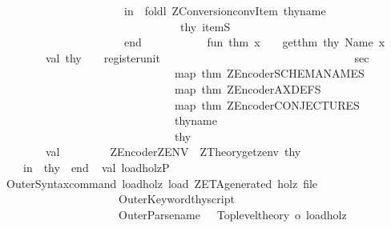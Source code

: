 \begin{isabellebody}
\ \ \ \ \ \ \ \ \ \ \ \ \ \ \ \ \ \ \ \ \ \ \ \ \ in\ \ foldl\ {\isacharparenleft}ZConversion{\isachardot}convItem\ thy{\isacharunderscore}name{\isacharparenright}\ \isanewline
\ \ \ \ \ \ \ \ \ \ \ \ \ \ \ \ \ \ \ \ \ \ \ \ \ \ \ \ \ \ \ \ \ \ \ thy\ itemS\ \isanewline
\ \ \ \ \ \ \ \ \ \ \ \ \ \ \ \ \ \ \ \ \ \ \ \ \ end\isanewline
\ \ \ \ \ \ \ \ \ \ \ fun\ thm\ x\ \ \ {\isacharequal}\ get{\isacharunderscore}thm\ thy{\isacharprime}\ {\isacharparenleft}Name\ x{\isacharparenright}\isanewline
\ \ \ \ \ \ \ \ \ \ \ val\ thy{\isacharprime}{\isacharprime}\ \ \ {\isacharequal}\ register{\isacharunderscore}unit\isanewline
\ \ \ \ \ \ \ \ \ \ \ \ \ \ \ \ \ \ \ \ \ \ \ \ \ \ \ \ \ \ \ \ \ \ sec\isanewline
\ \ \ \ \ \ \ \ \ \ \ \ \ \ \ \ \ \ \ \ \ \ \ \ \ \ \ \ \ \ \ \ \ \ {\isacharparenleft}map\ thm\ {\isacharparenleft}{\isacharbang}ZEncoder{\isachardot}SCHEMANAMES{\isacharparenright}{\isacharparenright}\ \isanewline
\ \ \ \ \ \ \ \ \ \ \ \ \ \ \ \ \ \ \ \ \ \ \ \ \ \ \ \ \ \ \ \ \ \ {\isacharparenleft}map\ thm\ {\isacharparenleft}{\isacharbang}ZEncoder{\isachardot}AXDEFS{\isacharparenright}{\isacharparenright}\ \isanewline
\ \ \ \ \ \ \ \ \ \ \ \ \ \ \ \ \ \ \ \ \ \ \ \ \ \ \ \ \ \ \ \ \ \ {\isacharparenleft}map\ thm\ {\isacharparenleft}{\isacharbang}ZEncoder{\isachardot}CONJECTURES{\isacharparenright}{\isacharparenright}\ \isanewline
\ \ \ \ \ \ \ \ \ \ \ \ \ \ \ \ \ \ \ \ \ \ \ \ \ \ \ \ \ \ \ \ \ \ thy{\isacharunderscore}name\ \isanewline
\ \ \ \ \ \ \ \ \ \ \ \ \ \ \ \ \ \ \ \ \ \ \ \ \ \ \ \ \ \ \ \ \ \ thy{\isacharprime}\isanewline
\ \ \ \ \ \ \ \ \ \ \ val\ {\isacharunderscore}\ \ \ \ \ \ \ {\isacharequal}\ {\isacharparenleft}ZEncoder{\isachardot}ZENV\ {\isacharcolon}{\isacharequal}\ {\isacharparenleft}ZTheory{\isachardot}get{\isacharunderscore}zenv\ thy{\isacharprime}{\isacharprime}{\isacharparenright}{\isacharparenright}\isanewline
\ \ \ \ \ \ \ in\ \ thy{\isacharprime}{\isacharprime}\ \ end{\isacharsemicolon}\isanewline
\ {\isacharverbatimclose}\isanewline
\isanewline
\isanewline
{}\isamarkupfalse%
{\isacharverbatimopen}\isanewline
val\ load{\isacharunderscore}holzP\ {\isacharequal}\isanewline
\ \ \ \ OuterSyntax{\isachardot}command\ {\isachardoublequote}load{\isacharunderscore}holz{\isachardoublequote}\ {\isachardoublequote}load\ ZETA{\isacharminus}generated\ {\isachardot}holz\ file{\isachardoublequote}\isanewline
\ \ \ \ \ \ \ \ \ \ \ \ \ \ \ \ \ \ \ \ \ \ \ \ OuterKeyword{\isachardot}thy{\isacharunderscore}script\isanewline
\ \ \ \ \ \ \ \ \ \ \ \ \ \ \ \ \ \ \ \ \ \ \ \ {\isacharparenleft}{\isacharparenleft}OuterParse{\isachardot}name{\isacharparenright}\ \ {\isachargreater}{\isachargreater}\ {\isacharparenleft}Toplevel{\isachardot}theory\ o\ load{\isacharunderscore}holz{\isacharparenright}{\isacharparenright}{\isacharsemicolon}\isanewline

\end{isabellebody}
